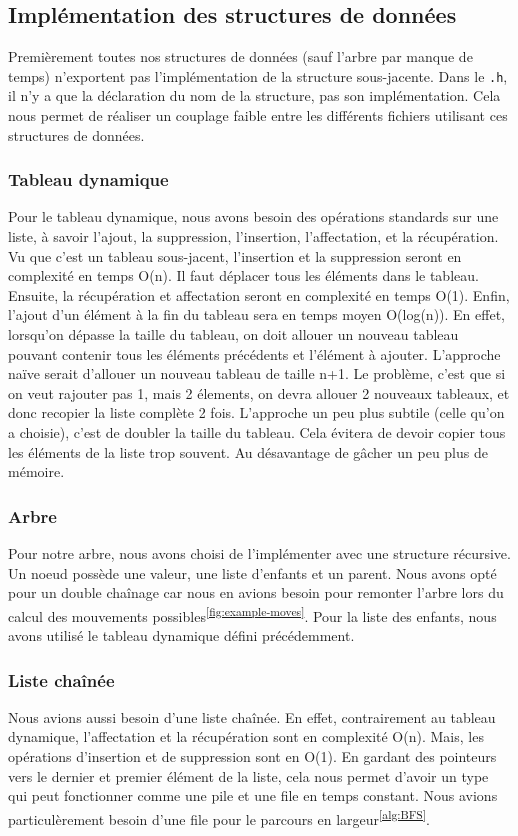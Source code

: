 \subsection{Implémentation des structures de données}
Premièrement toutes nos structures de données (sauf l'arbre par manque de temps)
n'exportent pas l'implémentation de la structure sous-jacente. Dans le \verb|.h|, il n'y a que la déclaration
du nom de la structure, pas son implémentation. Cela nous permet de réaliser un couplage faible
entre les différents fichiers utilisant ces structures de données.
\subsubsection{Tableau dynamique}
Pour le tableau dynamique, nous avons besoin des opérations standards 
sur une liste, à savoir l'ajout, la suppression, l'insertion, l'affectation, et la récupération.
Vu que c'est un tableau sous-jacent, l'insertion et la suppression seront en complexité en temps O(n).
Il faut déplacer tous les éléments dans le tableau.
Ensuite, la récupération et affectation seront en complexité en temps O(1).
Enfin, l'ajout d'un élément à la fin du tableau sera en temps moyen O(log(n)).
En effet, lorsqu'on dépasse la taille du tableau, on doit allouer un nouveau tableau
pouvant contenir tous les éléments précédents et l'élément à ajouter.
L'approche naïve serait d'allouer un nouveau tableau de taille n+1. Le problème,
c'est que si on veut rajouter pas 1, mais 2 élements, on devra allouer 2 nouveaux tableaux, et donc recopier la liste complète 2 fois.
L'approche un peu plus subtile (celle qu'on a choisie), c'est de doubler la taille du tableau.
Cela évitera de devoir copier tous les éléments de la liste trop souvent. Au désavantage de gâcher un peu plus de mémoire.
\subsubsection{Arbre}
Pour notre arbre, nous avons choisi de l'implémenter avec une structure récursive.
Un noeud possède une valeur, une liste d'enfants et un parent.
Nous avons opté pour un double chaînage car nous en avions besoin pour remonter l'arbre
lors du calcul des mouvements possibles\textsuperscript{\ref{fig:example-moves}}.
Pour la liste des enfants, nous avons utilisé le tableau dynamique défini précédemment.
\subsubsection{Liste chaînée}
Nous avions aussi besoin d'une liste chaînée.
En effet, contrairement au tableau dynamique, l'affectation et la récupération sont en complexité O(n).
Mais, les opérations d'insertion et de suppression sont en O(1). En gardant
des pointeurs vers le dernier et premier élément de la liste, cela nous permet d'avoir un type
qui peut fonctionner comme une pile et une file en temps constant. Nous avions
particulèrement besoin d'une file pour le parcours en largeur\textsuperscript{\ref{alg:BFS}}.
